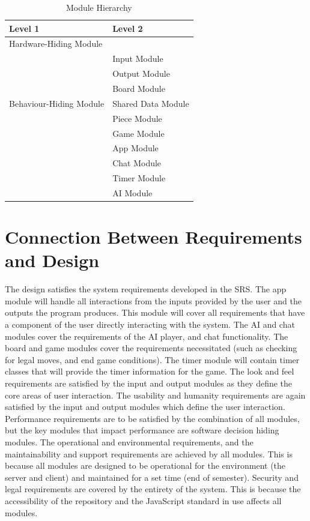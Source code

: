 \documentclass[12pt, titlepage]{article}
\begin{document}
\begin{table}[h!]
\centering
\begin{tabular}{p{} p{}}
\toprule
\textbf{Level 1} & \textbf{Level 2}\\
\midrule

{Hardware-Hiding Module} & ~ \\
\midrule

\multirow{7}{0.3\textwidth}{Behaviour-Hiding Module} 
& Input Module\\
& Output Module\\
& Board Module\\
& Shared Data Module\\
& Piece Module \\
& Game Module\\
\midrule

\multirow{3}{0.3\textwidth}{Software Decision Module}
& App Module\\
& Chat Module\\
& Timer Module\\
& AI Module\\
\bottomrule

\end{tabular}
\caption{Module Hierarchy}
\label{TblMH}
\end{table}

\section{Connection Between Requirements and Design} \label{SecConnection}

The design satisfies the system requirements developed in the SRS. The app module will handle all interactions from the inputs provided by the user and the outputs the program produces. This module will cover all requirements that have a component of the user directly interacting with the system. The AI and chat modules cover the requirements of the AI player, and chat functionality. The board and game modules cover the requirements necessitated (such as checking for legal moves, and end game conditions). The timer module will contain timer classes that will provide the timer information for the game. The look and feel requirements are satisfied by the input and output modules as they define the core areas of user interaction. The usability and humanity requirements are again satisfied by the input and output modules which define the user interaction. Performance requirements are to be satisfied by the combination of all modules, but the key modules that impact performance are software decision hiding modules. The operational and environmental requirements, and the maintainability and support requirements are achieved by all modules. This is because all modules are designed to be operational for the environment (the server and client) and maintained for a set time (end of semester). Security and legal requirements are covered by the entirety of the system. This is because the accessibility of the repository and the JavaScript standard in use affects all modules.
\end{document}
